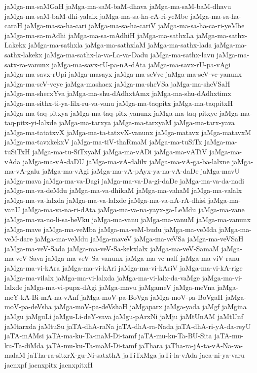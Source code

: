 {jaMga-ma-saMGaH
jaMga-ma-saM-baM-dhava
jaMga-ma-saM-baM-dhavu
jaMga-ma-saM-baM-dhi-yalalx
jaMga-ma-sa-ha-cA-ri-yeMbe
jaMga-ma-sa-ha-caraH
jaMga-ma-sa-ha-cari
jaMga-ma-sa-ha-cariV
jaMga-ma-sa-ha-ca-ri-yeMbe
jaMga-ma-sa-mAdhi
jaMga-ma-sa-mAdhiH
jaMga-ma-sathxLa
jaMga-ma-sathx-Lakekx
jaMga-ma-sathxla
jaMga-ma-sathxlaM
jaMga-ma-sathx-lada
jaMga-ma-sathx-lakekx
jaMga-ma-sathx-la-va-La-va-Dadu
jaMga-ma-sathx-lavu
jaMga-ma-satx-ra-vanunx
jaMga-ma-savx-rU-pa-nA-dAta
jaMga-ma-savx-rU-pa-vAgi
jaMga-ma-savx-rUpi
jaMga-masayx
jaMga-ma-seVve
jaMga-ma-seV-ve-yanunx
jaMga-ma-seV-veye
jaMga-mashacx
jaMga-ma-sheVSa
jaMga-ma-sheVSaH
jaMga-ma-shecxYva
jaMga-ma-shu-dAdhxtAmx
jaMga-ma-shu-dAdhxtimx
jaMga-ma-sithx-ti-ya-lilx-ru-va-vanu
jaMga-ma-taqpitx
jaMga-ma-taqpitxH
jaMga-ma-taq-pitxya
jaMga-ma-taq-pitx-yanunx
jaMga-ma-taq-pitxye
jaMga-ma-taq-pitx-yi-lalxde
jaMga-ma-tarxya
jaMga-ma-tarxyaM
jaMga-ma-tarx-yava
jaMga-ma-tatatxvX
jaMga-ma-ta-tatxvX-vanunx
jaMga-matavx
jaMga-matavxM
jaMga-ma-tavxkekxV
jaMga-ma-tiV-thaRmaM
jaMga-ma-tuSiTx
jaMga-ma-tuSiTxH
jaMga-ma-tu-SiTxyaM
jaMga-ma-vADi
jaMga-ma-vATiV
jaMga-ma-vAda
jaMga-ma-vA-daDU
jaMga-ma-vA-dalilx
jaMga-ma-vA-ga-ba-lalxne
jaMga-ma-vA-galu
jaMga-ma-vAgi
jaMga-ma-vA-pAyx-ya-na-vA-daDe
jaMga-mavU
jaMga-mava
jaMga-ma-va-Dagi
jaMga-ma-va-Da-gi-daDe
jaMga-ma-va-da-nadi
jaMga-ma-va-deMdu
jaMga-ma-va-dhikaM
jaMga-ma-vahaM
jaMga-ma-valalx
jaMga-ma-va-lalxda
jaMga-ma-va-lalxde
jaMga-ma-va-nA-rA-dhisi
jaMga-ma-vanU
jaMga-ma-va-na-ri-dAta
jaMga-ma-va-na-yayx-ga-LeMdu
jaMga-ma-vane
jaMga-ma-va-no-li-sa-beVku
jaMga-ma-vanu
jaMga-ma-vanuM
jaMga-ma-vanunx
jaMga-mave
jaMga-ma-veMba
jaMga-ma-veM-budu
jaMga-ma-veMda
jaMga-ma-veM-dare
jaMga-ma-veMdu
jaMga-maveV
jaMga-ma-veVSa
jaMga-ma-veVSaH
jaMga-ma-veV-Sada
jaMga-ma-veV-Sa-kekxlalx
jaMga-ma-veV-SamaM
jaMga-ma-veV-Sava
jaMga-ma-veV-Sa-vanunx
jaMga-ma-ve-nalf
jaMga-ma-viV-ranu
jaMga-ma-vi-kAra
jaMga-ma-vi-kAri
jaMga-ma-vi-kAriV
jaMga-ma-vi-kA-rige
jaMga-ma-vilalx
jaMga-ma-vi-lalxda
jaMga-ma-vi-lalx-da-vaMge
jaMga-ma-vi-lalxde
jaMga-ma-vi-pupx-dAgi
jaMga-mavu
jaMgameV
jaMga-meVna
jaMga-meY-kA-Bi-mA-na-vAnf
jaMga-moV-pa-BoVga
jaMga-moV-pa-BoVgaH
jaMga-moV-pa-deVsha
jaMga-moV-pa-deVshaH
jaMgaparx
jaMga-yada
jaMgf
jaMgina
jaMgu
jaMguLi
jaMgu-Li-deY-vava
jaMgu-pArxNi
jaMju
jaMtUnAM
jaMtUnf
jaMtarxda
jaMtuSu
jaTA-dhA-raNa
jaTA-dhA-ra-Nada
jaTA-dhA-ri-yA-da-reyU
jaTA-mAMsi
jaTA-ma-ku-Ta-maM-Di-tamf
jaTA-mu-ku-Ta-BU-Sita
jaTA-mu-ku-Ta-diMda
jaTA-mu-ku-Ta-maM-Di-tamf
jaThara
jaTha-ra-jA-ta-vA-Na-va-malaM
jaTha-ra-sitxrX-gu-Ni-satxthA
jaTiTxMga
jaTi-la-vAda
jaca-ni-ya-varu
jacnxpf
jacnxpitx
jacnxpitxH
}

